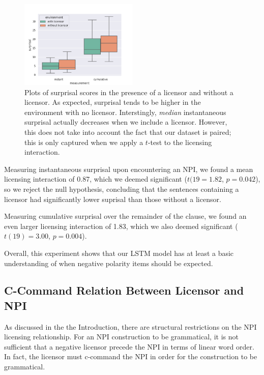 \documentclass[11pt, round]{article}
\begin{document}
\begin{figure}
    \centering
    \includegraphics[width=0.5\textwidth]{surprisal-c-command-box-plot}
    \caption{Plots of surprisal scores in the presence of a licensor and without a licensor. As expected, surprisal tends to be higher in the environment with no licensor. Interstingly, \textit{median} instantaneous surprisal actually decreases when we include a licensor. However, this does not take into account the fact that our dataset is paired; this is only captured when we apply a $t$-test to the licensing interaction.}
    \label{fig:basic-detection-box-plot}
\end{figure}

Measuring instantaneous surprisal upon encountering an NPI, we found a mean licensing interaction of 0.87, which we deemed significant ($t(19 = 1.82$, $p = 0.042$), so we reject the null hypothesis, concluding that the sentences containing a licensor had significantly lower suprisal than those without a licensor.

Measuring cumulative surprisal over the remainder of the clause, we found an even larger licensing interaction of 1.83, which we also deemed significant ($t(19) = 3.00$, $p = 0.004$).

Overall, this experiment shows that our LSTM model has at least a basic understanding of when negative polarity items should be expected.

\subsection{C-Command Relation Between Licensor and NPI}
\label{sec:c-command}

As discussed in the the Introduction, there are structural restrictions on the NPI licensing relationship. For an NPI construction to be grammatical, it is not sufficient that a negative licensor precede the NPI in terms of linear word order. In fact, the licensor must c-command the NPI in order for the construction to be grammatical.
\end{document}
